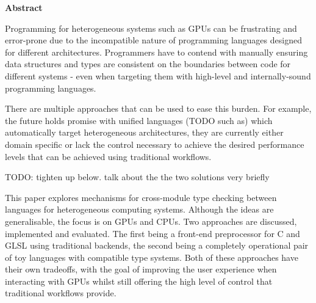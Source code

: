 \newpage
{\Huge \bf Abstract}
\vspace{24pt}






Programming for heterogeneous systems such as GPUs can be frustrating and
error-prone due to the incompatible nature of programming languages designed
for different architectures. Programmers have to contend with manually ensuring
data structures and types are consistent on the boundaries between code for
different systems - even when targeting them with high-level and
internally-sound programming languages.

There are multiple approaches that can be used to ease this burden. For
example, the future holds promise with unified languages (TODO such as) which
automatically target heterogeneous architectures, they are currently either
domain specific or lack the control necessary to achieve the desired
performance levels that can be achieved using traditional workflows.

TODO: tighten up below. talk about the the two solutions very briefly

This paper explores mechanisms for cross-module type checking between languages
for heterogeneous computing systems. Although the ideas are generalisable, the
focus is on GPUs and CPUs. Two approaches are discussed, implemented and
evaluated. The first being a front-end preprocessor for C and GLSL using
traditional backends, the second being a completely operational pair of toy
languages with compatible type systems. Both of these approaches have their own
tradeoffs, with the goal of improving the user experience when interacting with
GPUs whilst still offering the high level of control that traditional workflows
provide.

\newpage
\vspace*{\fill}
